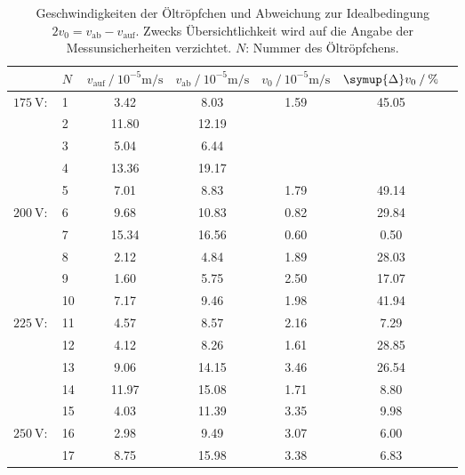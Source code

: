 \begin{table}[H]
    \centering
    \caption{Geschwindigkeiten der Öltröpfchen und Abweichung zur Idealbedingung $2v_0 = v_\text{ab}- v_\text{auf}$. Zwecks Übersichtlichkeit wird auf die Angabe der 
    Messunsicherheiten verzichtet. $N$: Nummer des Öltröpfchens.}
    \label{tab:Geschwindigkeiten}
    \begin{tabular}{c l S[table-format = 2.2] S S S[table-format = 1.2] S[table-format = 2.2]}
      \toprule
        {} & {$N$} & {$v_\text{auf} \mathbin{/} 10^{-5} \unit{\metre\per\second}$} & {$v_\text{ab} \mathbin{/} 10^{-5} \unit{\metre\per\second}$} &%
        {$v_0 \mathbin{/} 10^{-5} \unit{\metre\per\second}$} & {$\symup{\Delta} v_0 \mathbin{/} \unit{\percent}$} \\
        \midrule
        {$\qty{175}{\volt}:$} &  {1} & 3.42  &  8.03 & 1.59 & 45.05 \\
        {                   } &  {2} & 11.80 & 12.19 &      &       \\
        {                   } &  {3} &  5.04 &  6.44 &      &       \\
        {                   } &  {4} & 13.36 & 19.17 &      &       \\
        {                   } &  {5} &  7.01 &  8.83 & 1.79 & 49.14 \\
        {$\qty{200}{\volt}:$} &  {6} &  9.68 & 10.83 & 0.82 & 29.84 \\
        {                   } &  {7} & 15.34 & 16.56 & 0.60 &  0.50 \\
        {                   } &  {8} &  2.12 &  4.84 & 1.89 & 28.03 \\
        {                   } &  {9} &  1.60 &  5.75 & 2.50 & 17.07 \\
        {                   } & {10} &  7.17 &  9.46 & 1.98 & 41.94 \\ 
        {$\qty{225}{\volt}:$} & {11} &  4.57 &  8.57 & 2.16 &  7.29 \\ 
        {                   } & {12} &  4.12 &  8.26 & 1.61 & 28.85 \\
        {                   } & {13} &  9.06 & 14.15 & 3.46 & 26.54 \\
        {                   } & {14} & 11.97 & 15.08 & 1.71 &  8.80 \\
        {                   } & {15} &  4.03 & 11.39 & 3.35 &  9.98 \\
        {$\qty{250}{\volt}:$} & {16} &  2.98 &  9.49 & 3.07 &  6.00 \\
        {                   } & {17} &  8.75 & 15.98 & 3.38 &  6.83 \\

\end{tabular}
\end{table}
